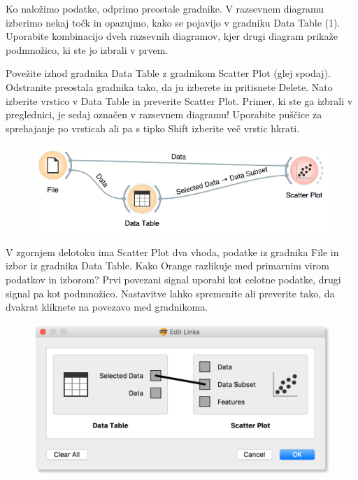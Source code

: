 Ko naložimo podatke, odprimo preostale gradnike. V razsevnem diagramu izberimo nekaj točk in opazujmo, kako se pojavijo v gradniku Data Table (1). Uporabite kombinacijo dveh razsevnih diagramov, kjer drugi diagram prikaže podmnožico, ki ste jo izbrali v prvem.

Povežite izhod gradnika Data Table z gradnikom Scatter Plot (glej spodaj). Odstranite preostala gradnika tako, da ju izberete in pritisnete Delete. Nato izberite vrstico v Data Table in preverite Scatter Plot. Primer, ki ste ga izbrali v preglednici, je sedaj označen v razsevnem diagramu! Uporabite puščice za sprehajanje po vrsticah ali pa s tipko Shift izberite več vrstic hkrati.

\begin{figure}[h]
  \centering
  \includegraphics[width=\linewidth]{workflow-fig5.png}
\end{figure}

V zgornjem delotoku ima Scatter Plot dva vhoda, podatke iz gradnika File in izbor iz gradnika Data Table. Kako Orange razlikuje med primarnim virom podatkov in izborom? Prvi povezani signal uporabi kot celotne podatke, drugi signal pa kot podmnožico. Nastavitve lahko spremenite ali preverite tako, da dvakrat kliknete na povezavo med gradnikoma.

\begin{figure}[h]
    \centering
    \includegraphics[width=\linewidth]{workflow-fig6.png}
  \end{figure}
  